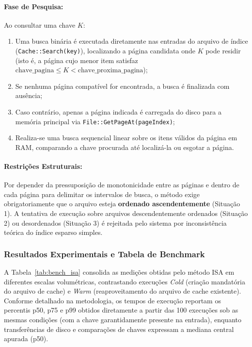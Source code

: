 \documentclass[12pt,a4paper]{article}
\begin{document}
\paragraph{Fase de Pesquisa:}
Ao consultar uma chave $K$:
\begin{enumerate}
    \item Uma busca binária é executada diretamente nas entradas do arquivo de índice (\texttt{Cache::Search(key)}), localizando a página candidata onde $K$ pode residir (isto é, a página cujo menor item satisfaz $\text{chave\_pagina} \le K < \text{chave\_proxima\_pagina}$);
    \item Se nenhuma página compatível for encontrada, a busca é finalizada com ausência;
    \item Caso contrário, apenas a página indicada é carregada do disco para a memória principal via \texttt{File::GetPageAt(pageIndex)};
    \item Realiza-se uma busca sequencial linear sobre os itens válidos da página em RAM, comparando a chave procurada até localizá-la ou esgotar a página.
\end{enumerate}

\paragraph{Restrições Estruturais:}
Por depender da pressuposição de monotonicidade entre as páginas e dentro de cada página para delimitar os intervalos de busca, o método exige obrigatoriamente que o arquivo esteja \textbf{ordenado ascendentemente} (Situação 1). A tentativa de execução sobre arquivos descendentemente ordenados (Situação 2) ou desordenados (Situação 3) é rejeitada pelo sistema por inconsistência teórica do índice esparso simples.

\subsubsection{Resultados Experimentais e Tabela de Benchmark}
A Tabela~\ref{tab:bench_isa} consolida as medições obtidas pelo método ISA em diferentes escalas volumétricas, contrastando execuções \textit{Cold} (criação mandatória do arquivo de cache) e \textit{Warm} (reaproveitamento do arquivo de cache existente). Conforme detalhado na metodologia, os tempos de execução reportam os percentis p50, p75 e p99 obtidos diretamente a partir das 100 execuções sob as mesmas condições (com a chave garantidamente presente na entrada), enquanto transferências de disco e comparações de chaves expressam a mediana central apurada (p50).
\end{document}
